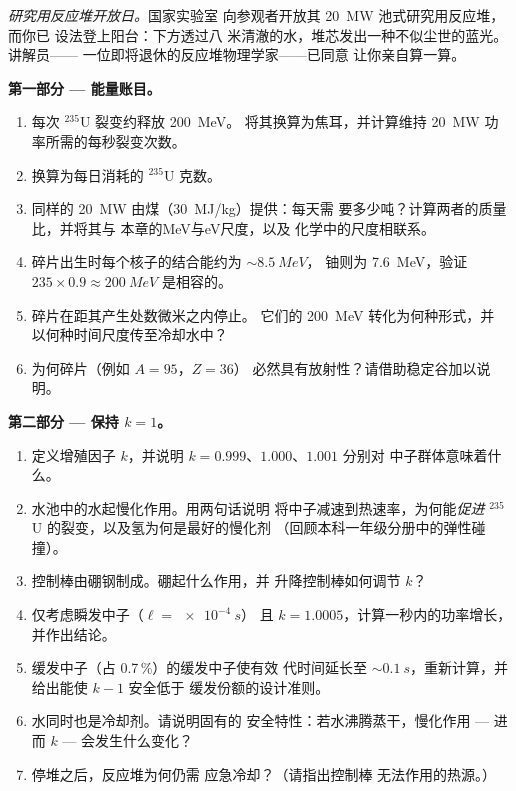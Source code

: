 \begin{problem}\label{pb:b3:nuclear-physics:1}
\emph{研究用反应堆开放日。}国家实验室
向参观者开放其 \qty{20}{MW} 池式研究用反应堆，而你已
设法登上阳台：下方透过八
米清澈的水，堆芯发出一种不似尘世的蓝光。讲解员——
一位即将退休的反应堆物理学家——已同意
让你亲自算一算。

\medskip\noindent\textbf{第一部分 --- 能量账目。}

\begin{enumerate}
  \item 每次 $^{235}$U 裂变约释放 \qty{200}{MeV}。
        将其换算为焦耳，并计算维持
        \qty{20}{MW} 功率所需的每秒裂变次数。
  \item 换算为每日消耗的 $^{235}$U 克数。
  \item 同样的 \qty{20}{MW} 由煤（\qty{30}{MJ/kg}）提供：每天需
        要多少吨？计算两者的质量比，并将其与
        本章的\unit{MeV}与\unit{eV}尺度，以及
        化学中的尺度相联系。
  \item 碎片出生时每个核子的结合能约为 $\sim\qty{8.5}{MeV}$，
        铀则为 \qty{7.6}{MeV}，验证
        $235\times0.9 \approx \qty{200}{MeV}$ 是相容的。
  \item 碎片在距其产生处数微米之内停止。
        它们的 \qty{200}{MeV} 转化为何种形式，并
        以何种时间尺度传至冷却水中？
  \item 为何碎片（例如 $A = 95$，$Z = 36$）
        必然具有放射性？请借助稳定谷加以说明。
\end{enumerate}

\medskip\noindent\textbf{第二部分 --- 保持 $k = 1$。}

\begin{enumerate}[resume]
  \item 定义增殖因子 $k$，并说明
        $k = 0.999$、$1.000$、$1.001$ 分别对
        中子群体意味着什么。
  \item 水池中的水起慢化作用。用两句话说明
        将中子减速到热速率，为何能\emph{促进}
        $^{235}$U 的裂变，以及氢为何是最好的慢化剂
        （回顾本科一年级分册中的弹性碰撞）。
  \item 控制棒由硼钢制成。硼起什么作用，并
        升降控制棒如何调节 $k$？
  \item 仅考虑瞬发中子（$\ell = \qty{e-4}{s}$）
        且 $k = 1.0005$，计算一秒内的功率增长，
        并作出结论。
  \item 缓发中子（占 0.7\,\%）的缓发中子使有效
        代时间延长至 $\sim\qty{0.1}{s}$，重新计算，并
        给出能使 $k - 1$ 安全低于
        缓发份额的设计准则。
  \item 水同时也是冷却剂。请说明固有的
        安全特性：若水沸腾蒸干，慢化作用 --- 进而
        $k$ --- 会发生什么变化？
  \item 停堆之后，反应堆为何仍需
        应急冷却？（请指出控制棒
        无法作用的热源。）
\end{enumerate}


\end{problem}
